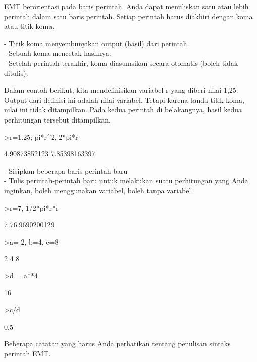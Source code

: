 \documentclass{article}
\begin{document}
\begin{eulernotebook}
\begin{eulercomment}
\begin{eulercomment}
\begin{eulercomment}
EMT berorientasi pada baris perintah. Anda dapat menuliskan satu atau lebih
perintah dalam satu baris perintah. Setiap perintah harus diakhiri dengan koma
atau titik koma.

- Titik koma menyembunyikan output (hasil) dari perintah.\\
- Sebuah koma mencetak hasilnya.\\
- Setelah perintah terakhir, koma diasumsikan secara otomatis (boleh tidak
ditulis).

Dalam contoh berikut, kita mendefinisikan variabel r yang diberi nilai 1,25.
Output dari definisi ini adalah nilai variabel. Tetapi karena tanda titik koma,
nilai ini tidak ditampilkan. Pada kedua perintah di belakangnya, hasil kedua
perhitungan tersebut ditampilkan.
\end{eulercomment}
\begin{eulerprompt}
>r=1.25; pi*r^2, 2*pi*r
\end{eulerprompt}
\begin{euleroutput}
  4.90873852123
  7.85398163397
\end{euleroutput}
\begin{eulercomment}
- Sisipkan beberapa baris perintah baru\\
- Tulis perintah-perintah baru untuk melakukan suatu perhitungan yang
Anda inginkan, boleh menggunakan variabel, boleh tanpa variabel.\\
\end{eulercomment}
\eulersubheading{}
\begin{eulerprompt}
>r=7, 1/2*pi*r*r
\end{eulerprompt}
\begin{euleroutput}
  7
  76.9690200129
\end{euleroutput}
\begin{eulerprompt}
>a= 2, b=4, c=8
\end{eulerprompt}
\begin{euleroutput}
  2
  4
  8
\end{euleroutput}
\begin{eulerprompt}
>d = a**4
\end{eulerprompt}
\begin{euleroutput}
  16
\end{euleroutput}
\begin{eulerprompt}
>c/d
\end{eulerprompt}
\begin{euleroutput}
  0.5
\end{euleroutput}
\begin{eulercomment}
Beberapa catatan yang harus Anda perhatikan tentang penulisan sintaks
perintah EMT.


\end{eulercomment}
\end{eulercomment}
\end{eulercomment}
\end{eulernotebook}
\end{document}
